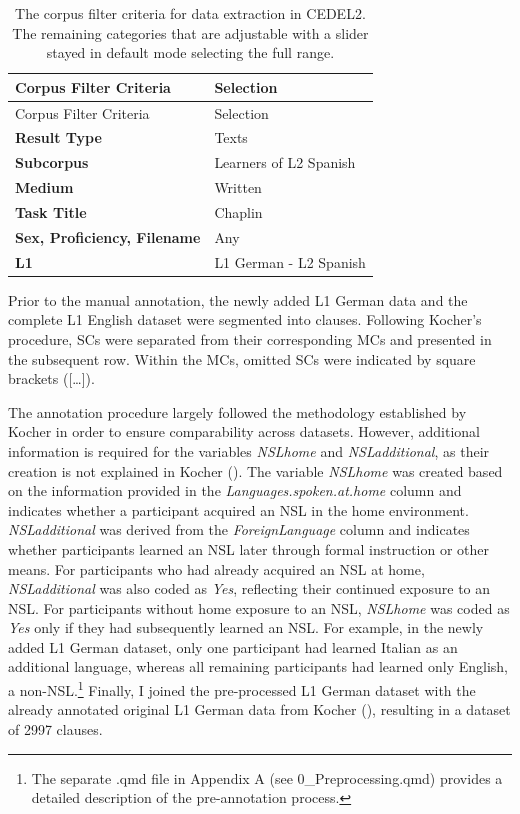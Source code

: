 \documentclass[
  letterpaper,
  DIV=11,
  numbers=noendperiod]{scrartcl}
\begin{document}
\begin{longtable}[]{@{}ll@{}}
\caption{The corpus filter criteria for data extraction in CEDEL2. The
remaining categories that are adjustable with a slider stayed in default
mode selecting the full range.}\label{tbl-corpuscriteria}\tabularnewline
\toprule\noalign{}
Corpus Filter Criteria & Selection \\
\midrule\noalign{}
\endfirsthead
\toprule\noalign{}
Corpus Filter Criteria & Selection \\
\midrule\noalign{}
\endhead
\bottomrule\noalign{}
\endlastfoot
\textbf{Result Type} & Texts \\
\textbf{Subcorpus} & Learners of L2 Spanish \\
\textbf{Medium} & Written \\
\textbf{Task Title} & Chaplin \\
\textbf{Sex, Proficiency, Filename} & Any \\
\textbf{L1} & L1 German - L2 Spanish \\
\end{longtable}

Prior to the manual annotation, the newly added L1 German data and the
complete L1 English dataset were segmented into clauses. Following
Kocher's procedure, SCs were separated from their corresponding MCs and
presented in the subsequent row. Within the MCs, omitted SCs were
indicated by square brackets ({[}\ldots{]}).

The annotation procedure largely followed the methodology established by
Kocher in order to ensure comparability across datasets. However,
additional information is required for the variables \emph{NSLhome} and
\emph{NSLadditional}, as their creation is not explained in Kocher
(). The variable \emph{NSLhome}
was created based on the information provided in the
\emph{Languages.spoken.at.home} column and indicates whether a
participant acquired an NSL in the home environment.
\emph{NSLadditional} was derived from the \emph{ForeignLanguage} column
and indicates whether participants learned an NSL later through formal
instruction or other means. For participants who had already acquired an
NSL at home, \emph{NSLadditional} was also coded as \emph{Yes},
reflecting their continued exposure to an NSL. For participants without
home exposure to an NSL, \emph{NSLhome} was coded as \emph{Yes} only if
they had subsequently learned an NSL. For example, in the newly added L1
German dataset, only one participant had learned Italian as an
additional language, whereas all remaining participants had learned only
English, a non-NSL.\footnote{The separate .qmd file in Appendix A (see
  0\_Preprocessing.qmd) provides a detailed description of the
  pre-annotation process.} Finally, I joined the pre-processed L1 German
dataset with the already annotated original L1 German data from Kocher
(), resulting in a dataset of
2997 clauses.
\end{document}
